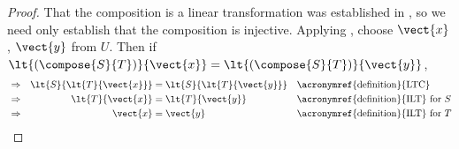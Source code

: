 %
\begin{proof}
That the composition is a linear transformation was established in , so we need only establish that the composition is injective.  Applying , choose $\vect{x}$, $\vect{y}$ from $U$.  Then if $\lt{\left(\compose{S}{T}\right)}{\vect{x}}=\lt{\left(\compose{S}{T}\right)}{\vect{y}}$,
%
\begin{align*}
%
&\Rightarrow&\lt{S}{\lt{T}{\vect{x}}}&=\lt{S}{\lt{T}{\vect{y}}}
&&\text{\acronymref{definition}{LTC}}\\
%
&\Rightarrow&\lt{T}{\vect{x}}&=\lt{T}{\vect{y}}
&&\text{\acronymref{definition}{ILT} for $S$}\\
%
&\Rightarrow&\vect{x}&=\vect{y}
&&\text{\acronymref{definition}{ILT} for $T$}
\end{align*}
%
\end{proof}
%
%
